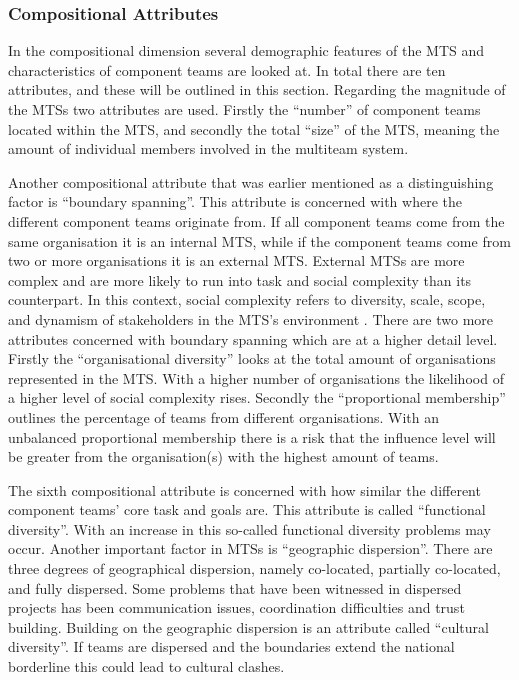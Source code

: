 \subsubsection{Compositional Attributes}

In the compositional dimension several demographic features of the MTS and characteristics of component teams are looked at. In total there are ten attributes, and these will be outlined in this section. Regarding the magnitude of the MTSs two attributes are used. Firstly the ``number'' of component teams located within the MTS, and secondly the total ``size'' of the MTS, meaning the amount of individual members involved in the multiteam system.


Another compositional attribute that was earlier mentioned as a distinguishing factor is ``boundary spanning''. This attribute is concerned with where the different component teams originate from. If all component teams come from the same organisation it is an internal MTS, while if the component teams come from two or more organisations it is an external MTS. External MTSs are more complex and are more likely to run into task and social complexity than its counterpart. In this context, social complexity refers to diversity, scale, scope, and dynamism of stakeholders in the MTS's environment \cite{?}. There are two more attributes concerned with boundary spanning which are at a higher detail level. Firstly the ``organisational diversity'' looks at the total amount of organisations represented in the MTS. With a higher number of organisations the likelihood of a higher level of social complexity rises. Secondly the ``proportional membership'' outlines the percentage of teams from different organisations. With an unbalanced proportional membership there is a risk that the influence level will be greater from the organisation(s) with the highest amount of teams.

The sixth compositional attribute is concerned with how similar the different component teams' core task and goals are. This attribute is called ``functional diversity''. With an increase in this so-called functional diversity problems may occur. Another important factor in MTSs is ``geographic dispersion''. There are three degrees of geographical dispersion, namely co-located, partially co-located, and fully dispersed. Some problems that have been witnessed in dispersed projects has been communication issues, coordination difficulties and trust building. Building on the geographic dispersion is an attribute called ``cultural diversity''. If teams are dispersed and the boundaries extend the national borderline this could lead to cultural clashes.

